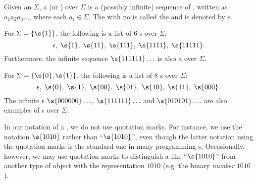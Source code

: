 \begin{flex}
\begin{definition} \label{definition:String-word-empty-string}
Given an  $\Sigma$, a  (or ) over $\Sigma$ is a (possibly infinite) sequence of , written as $a_1a_2a_3\ldots$, where each $a_i \in \Sigma$. 
The  with no  is called the  and is denoted by $\epsilon$.
\end{definition}

\begin{example} \label{example:Strings-over-the-unary-alphabet}
For $\Sigma = \{\s{1}\}$, the following is a list of 6 s over $\Sigma$: 
\[
    \epsilon,\; \s{1},\; \s{11},\; \s{111},\; \s{1111},\; \s{11111}.
\]
Furthermore, the infinite sequence $\s{111111}\ldots$ is also a  over $\Sigma$.
\end{example}

\begin{example} \label{example:Strings-over-the-binary-alphabet}
For $\Sigma = \{\s{0},\s{1}\}$, the following is a list of 8 s over $\Sigma$: 
\[
\epsilon,\; \s{0},\; \s{1},\; \s{00},\; \s{01},\; \s{10},\; \s{11},\; \s{000}.
\] 
The infinite s $\s{000000}\ldots$, $\s{111111}\ldots$ and $\s{010101}\ldots$ are also examples of s over $\Sigma$.
\end{example}
\end{flex}


\begin{note} \label{note:Strings-and-quotation-marks}
In our notation of a , we do not use quotation marks. For instance, we use the notation $\s{1010}$ rather than ``$\s{1010}$'', even though the latter notation using the quotation marks is the standard one in many programming s. Occasionally, however, we may use quotation marks to distinguish a  like ``$\s{1010}$'' from another type of object with the representation $1010$ (e.g. the binary \emph{number} $1010$).
\end{note}



